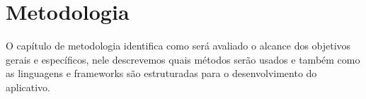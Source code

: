 \chapter{Metodologia}

O capítulo de metodologia identifica como será avaliado o alcance dos objetivos gerais e específicos, nele  descrevemos quais métodos serão usados e também como as linguagens e frameworks são estruturadas para o desenvolvimento do aplicativo. 
